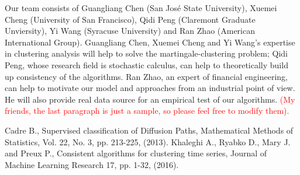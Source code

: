 \documentclass[9pt,a4paper]{article}
\begin{document}
 Our team consists of Guangliang Chen (San Jos\'e State University), Xuemei Cheng (University of San Francisco), Qidi Peng (Claremont Graduate Unviersity), Yi Wang (Syracuse University) and Ran Zhao (American International Group). Guangliang Chen, Xuemei Cheng and Yi Wang's expertise in clustering analysis will help to solve the martingale-clustering problem; Qidi Peng, whose research field is stochastic calculus, can help to theoretically build up consistency of the algorithms. Ran Zhao, an expert of financial engineering, can help to motivate our model and approaches from an industrial point of view. He will also provide real data source for an empirical test of our algorithms. \textcolor{red}{(My friends, the last paragraph is just a sample, so please feel free to modify them).}
 \begin{thebibliography}{99}
 Cadre B., Supervised classification of Diffusion Paths, Mathematical Methods of Statistics, Vol. 22, No. 3, pp. 213-225, (2013).
 Khaleghi A., Ryabko D., Mary J. and Preux P., Consistent algorithms for clustering time series, Journal of Machine Learning Research 17, pp. 1-32, (2016).

\end{thebibliography}
\end{document}
